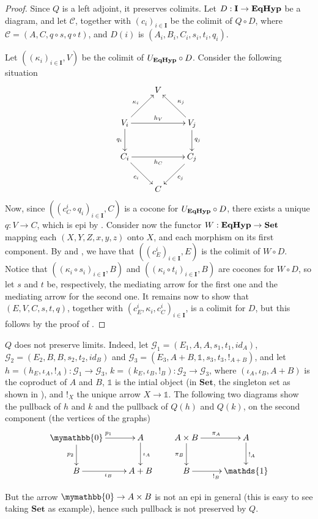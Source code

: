 \documentclass[a4paper,UKenglish,cleveref,pdftex,thm-restate,numberwithinsect]{lipics-v2021}
\newcommand{\cat}[1]{\ensuremath{\mathbf{#1}}}
\newcommand{\Set}{\mathbf{Set}}
\newcommand{\initial}{\mymathbb{0}}
\newcommand{\terminal}{\mathds{1}}
\newcommand{\catname}[1]{\textbf{\textup{#1}}}
\newcommand{\EqHyp}{\catname{EqHyp}} %
\begin{document}
\begin{proof}
	Since $Q$ is a left adjoint, it preserves colimits.
	Let $D: \cat I \to \EqHyp$ be a diagram, and let $\mathcal{C}$, together with  $(c_i)_{i\in \cat I}$ be the colimit of $Q \circ D$, where $\mathcal{C} = (A, C, q\circ s, q\circ t)$, and $D(i)$ is $(A_i, B_i, C_i, s_i, t_i, q_i)$.
	\iffalse
	Let now $T: \EqHyp \to \Set$ be the functor mapping each graph with equivalence onto its second component, $T((X, Y, Z, x, y, z)) = Y$, and each morphims onto its second component.\fi
	Let $((\kappa_i)_{i\in \cat I}, V)$ be the colimit of $U_\EqHyp \circ D$.
	Consider the following situation
	\[\xymatrix{
		&  {V} &                             \\
		V_i \ar[ur]^{\kappa_i} \ar[rr]^{h_V} \ar[d]_{q_i} && V_j \ar[ul]_{\kappa_j} \ar[d]^{q_j}\\
		C_i \ar[dr]_{c_i}      \ar[rr]_{h_C}              &&C_j  \ar[dl]^{c_j}                  \\
		&  {C} &
	}\]
	Now, since $((c^i_C \circ q_i)_{i \in \cat I}, C)$ is a cocone for $U_\EqHyp \circ D$, there exists a unique $q: V \to C$, which is epi by .
	Consider now the functor $W: \EqHyp \to \Set$ mapping each $(X, Y, Z, x, y, z)$ onto $X$, and each morphism on its first component.
	By  and , we have that $((c_E^i)_{i \in \cat I}, E)$ is the colimit of $W \circ D$.
	Notice that $((\kappa_i \circ s_i)_{i \in \cat{I}}, B)$ and $((\kappa_i \circ t_i)_{i \in \cat I}, B)$ are cocones for $W \circ D$, so let $s$ and $t$ be, respectively, the mediating arrow for the first one and the mediating arrow for the second one. It remains now to show that $(E, V, C, s, t, q)$, together with $(c_E^i, \kappa_i, c_C^i)_{i \in \cat I}$, is a colimit for $D$, but this follows by the proof of .
\end{proof}

\begin{example}
	$Q$ does not preserve limits. Indeed, let $\mathcal{G}_1 = (E_1, A, A, s_1, t_1, id_A)$, $\mathcal{G}_2 = (E_2, B, B, s_2, t_2, id_B)$ and $\mathcal{G}_3 = (E_3, A + B, \terminal, s_3, t_3, !_{A + B})$, and let $h = (h_E, \iota_A, !_A): \mathcal{G}_1 \to \mathcal{G}_3$, $k = (k_E, \iota_B, !_B): \mathcal{G}_2 \to \mathcal{G}_3$, where $(\iota_A, \iota_B, A + B)$ is the coproduct of $A$ and $B$, $\terminal$ is the intial object (in $\Set$, the singleton set as shown in ), and $!_X$ the unique arrow $X \to \terminal$.
	The following two diagrams show the pullback of $h$ and $k$ and the pullback of $Q(h)$ and $Q(k)$, on the second component (the vertices of the graphs)
	\[\xymatrix{
		\initial \ar[r]^{p_1} \ar[d]_{p_2}& A \ar[d]^{\iota_A} \\
		B \ar[r]_{\iota_B} & A+B
	}
	\qquad
	\xymatrix{
		{A \times B} \ar[r]^{\pi_A} \ar[d]_{\pi_B} & A \ar[d]^{!_A} \\
		B \ar[r]_{!_B} & \terminal
	}\]
	
	But the arrow $\initial \to A \times B$ is not an epi in general (this is easy to see taking $\Set$ as example), hence such pullback is not preserved by $Q$.
\end{example}
\end{document}
